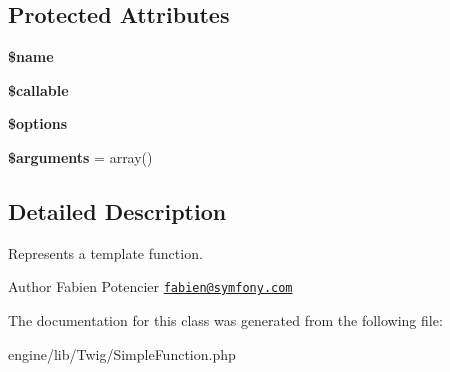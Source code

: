 \subsection*{Protected Attributes}
\begin{DoxyCompactItemize}
\item 
\hypertarget{class_twig___simple_function_ab2fc40d43824ea3e1ce5d86dee0d763b}{}{\bfseries \$name}\label{class_twig___simple_function_ab2fc40d43824ea3e1ce5d86dee0d763b}

\item 
\hypertarget{class_twig___simple_function_ae3d0fc9fa800751a4a5e2917209d85f2}{}{\bfseries \$callable}\label{class_twig___simple_function_ae3d0fc9fa800751a4a5e2917209d85f2}

\item 
\hypertarget{class_twig___simple_function_a011800c63ece4cbbfa77136a20607023}{}{\bfseries \$options}\label{class_twig___simple_function_a011800c63ece4cbbfa77136a20607023}

\item 
\hypertarget{class_twig___simple_function_a61eded163d962fc248b3cf209000979b}{}{\bfseries \$arguments} = array()\label{class_twig___simple_function_a61eded163d962fc248b3cf209000979b}

\end{DoxyCompactItemize}


\subsection{Detailed Description}
Represents a template function.

\begin{DoxyAuthor}{Author}
Fabien Potencier \href{mailto:fabien@symfony.com}{\tt fabien@symfony.\+com} 
\end{DoxyAuthor}


The documentation for this class was generated from the following file\+:\begin{DoxyCompactItemize}
\item 
engine/lib/\+Twig/Simple\+Function.\+php\end{DoxyCompactItemize}
